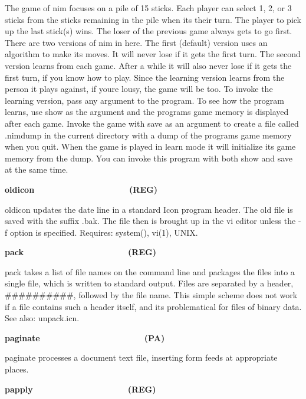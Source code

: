 The game of \textsf{nim} focuses on a pile of 15 sticks. Each player can
select 1, 2, or 3 sticks from the sticks remaining in the pile when
it{\textquotesingle}s their turn. The player to pick up the last
stick(s) wins. The loser of the previous game always gets to go first.
There are two versions of nim in here. The first (default) version uses
an algorithm to make its moves. It will never lose if it gets the first
turn. The second version learns from each game. After a while it will
also never lose if it gets the first turn, if you know how to play.
Since the learning version learns from the person it plays against, if
you{\textquotesingle}re lousy, the game will be too. To invoke the
learning version, pass any argument to the program. To see how the
program learns, use \textsf{show} as the argument and the
program{\textquotesingle}s game memory is displayed after each game.
Invoke the game with \textsf{save} as an argument to create a file
called {\textquotedbl}.nimdump{\textquotedbl} in the current directory
with a dump of the program{\textquotesingle}s game memory when you
quit. When the game is played in learn mode it will initialize its game
memory from the dump. You can invoke this program with both
\textsf{show} and \textsf{save} at the same time.

{\sffamily\bfseries
oldicon\ \ \ \ \ \ \ \ \ \ \ \ \ \ \ \ \ \ \ \ (REG)}

\textsf{oldicon} updates the date line in a standard Icon program
header. The old file is saved with the suffix \textsf{.bak}. The file
then is brought up in the vi editor unless the
\textsf{{}-f} option is specified. Requires: \textsf{system()},
\textsf{vi(1)}, UNIX.

{\sffamily\bfseries
pack\ \ \ \ \ \ \ \ \ \ \ \ \ \ \ \ \ \ \ \ \ \ (REG)}

\textsf{pack} takes a list of file names on the command line and
packages the files into a single file, which is written to standard
output. Files are separated by a header, \#\#\#\#\#\#\#\#\#\#, followed
by the file name. This simple scheme does not work if a file contains
such a header itself, and it{\textquotesingle}s problematical for files
of binary data. See also: \textsf{unpack.icn}.

{\sffamily\bfseries
paginate\ \ \ \ \ \ \ \ \ \ \ \ \ \ \ \ \ \ \ \  \ \ (PA)}

\textsf{paginate} processes a document text file, inserting form feeds at appropriate places. 

{\sffamily\bfseries
papply\ \ \ \ \ \ \ \ \ \ \ \ \ \ \ \ \ \ \ \ (REG)}

